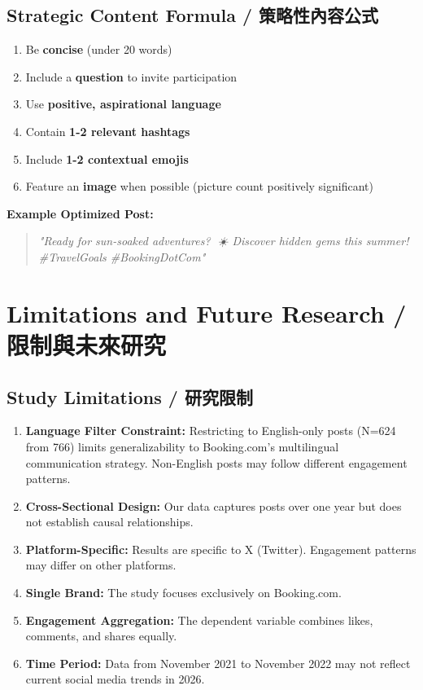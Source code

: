 \documentclass[12pt,a4paper]{article}
\begin{document}
\subsection{Strategic Content Formula / 策略性內容公式}

\begin{enumerate}
    \item Be \textbf{concise} (under 20 words)
    \item Include a \textbf{question} to invite participation
    \item Use \textbf{positive, aspirational language}
    \item Contain \textbf{1-2 relevant hashtags}
    \item Include \textbf{1-2 contextual emojis}
    \item Feature an \textbf{image} when possible (picture count positively significant)
\end{enumerate}

\textbf{Example Optimized Post:}
\begin{quote}
\textit{"Ready for sun-soaked adventures? 🌴☀️ Discover hidden gems this summer! \#TravelGoals \#BookingDotCom"}
\end{quote}

\newpage

\section{Limitations and Future Research / 限制與未來研究}

\subsection{Study Limitations / 研究限制}

\begin{enumerate}
    \item \textbf{Language Filter Constraint:} Restricting to English-only posts (N=624 from 766) limits generalizability to Booking.com's multilingual communication strategy. Non-English posts may follow different engagement patterns.

    \item \textbf{Cross-Sectional Design:} Our data captures posts over one year but does not establish causal relationships.

    \item \textbf{Platform-Specific:} Results are specific to X (Twitter). Engagement patterns may differ on other platforms.

    \item \textbf{Single Brand:} The study focuses exclusively on Booking.com.

    \item \textbf{Engagement Aggregation:} The dependent variable combines likes, comments, and shares equally.

    \item \textbf{Time Period:} Data from November 2021 to November 2022 may not reflect current social media trends in 2026.
\end{enumerate}
\end{document}
